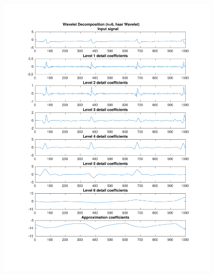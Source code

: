 \documentclass[11pt,a4paper]{article}
\begin{document}
\begin{figure}[H]
\centering
\begin{minipage}{0.48\textwidth}
	\centering
	\includegraphics[width=\textwidth]{fig/118l1_dwt1.pdf}
\end{minipage}
\begin{minipage}{0.48\textwidth}
	\centering

\end{minipage}
\end{figure}
\end{document}
